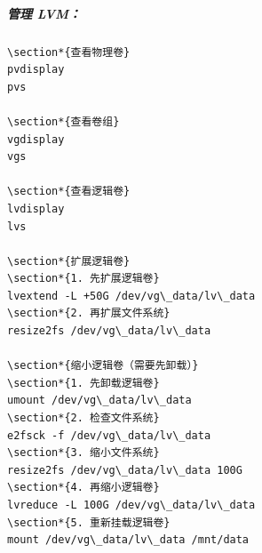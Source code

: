 \documentclass[12pt,UTF8]{ctexbook}
\begin{document}
\subparagraph{管理 LVM：}
\begin{verbatim}
\section*{查看物理卷}
pvdisplay
pvs

\section*{查看卷组}
vgdisplay
vgs

\section*{查看逻辑卷}
lvdisplay
lvs

\section*{扩展逻辑卷}
\section*{1. 先扩展逻辑卷}
lvextend -L +50G /dev/vg\_data/lv\_data
\section*{2. 再扩展文件系统}
resize2fs /dev/vg\_data/lv\_data

\section*{缩小逻辑卷（需要先卸载）}
\section*{1. 先卸载逻辑卷}
umount /dev/vg\_data/lv\_data
\section*{2. 检查文件系统}
e2fsck -f /dev/vg\_data/lv\_data
\section*{3. 缩小文件系统}
resize2fs /dev/vg\_data/lv\_data 100G
\section*{4. 再缩小逻辑卷}
lvreduce -L 100G /dev/vg\_data/lv\_data
\section*{5. 重新挂载逻辑卷}
mount /dev/vg\_data/lv\_data /mnt/data


\end{verbatim}
\end{document}
